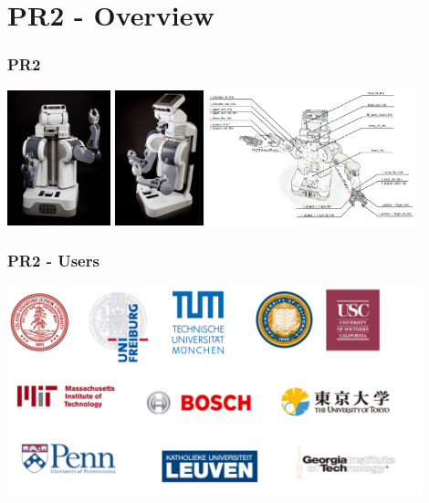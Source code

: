 \documentclass[t]{beamer}
\begin{document}
\section{PR2 - Overview}
\begin{frame}
  \frametitle{PR2}
\hspace{-3ex}\includegraphics[width=3cm]{img/PR2_front.jpeg} 
\includegraphics[width=2.57cm]{img/PR2_side.jpeg} 
\includegraphics[width=6cm]{img/pr2_link_name.png}
\end{frame}

\begin{frame}
  \frametitle{PR2 - Users}
\centering\includegraphics[width=12cm]{img/pr2_users.pdf} 
\end{frame}
\end{document}
